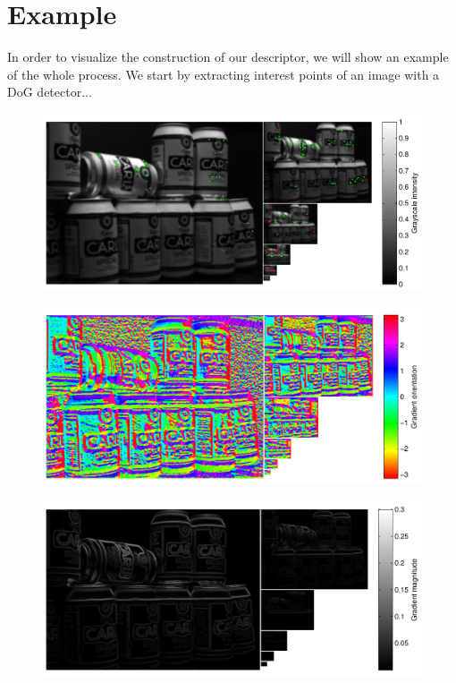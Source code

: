 \documentclass[thesis.tex]{subfiles}
\begin{document}
\section{Example}
%
In order to visualize the construction of our descriptor, we will show an example of the whole process. We start by extracting interest points of an image with a DoG detector...
%
\begin{figure}[H]
    \centering
    \includegraphics[width=\textwidth]{img/cellHistScaleSpacesP.pdf}
    \caption{}
    \label{fig:cellHistScaleSpacesP}
\end{figure}
%
\begin{figure}[H]
    \centering
    \includegraphics[width=\textwidth]{img/cellHistScaleSpacesV.pdf}
    \caption{}
    \label{fig:cellHistScaleSpacesV}
\end{figure}
%
\begin{figure}[H]
    \centering
    \includegraphics[width=\textwidth]{img/cellHistScaleSpacesM.pdf}
    \caption{}
    \label{fig:cellHistScaleSpacesM}
\end{figure}
\end{document}
